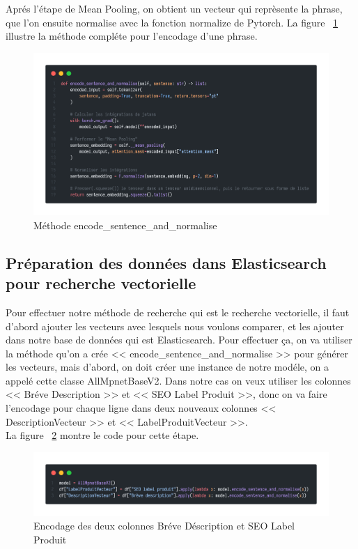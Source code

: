 \noindent
Aprés l'étape de Mean Pooling, on obtient un vecteur qui reprèsente la phrase, que l'on ensuite normalise avec la fonction normalize de Pytorch.
La figure ~\ref{fig:encodesentence} illustre la méthode compléte pour l'encodage d'une phrase.

\begin{figure}[H]
	\centering
	\includegraphics[width=\textwidth]{logos/encode_sentence.png}
	\caption{Méthode encode\_sentence\_and\_normalise}
	\label{fig:encodesentence}
\end{figure}

\subsection{Préparation des données dans Elasticsearch pour recherche vectorielle}
\noindent
Pour effectuer notre méthode de recherche qui est le recherche vectorielle, il faut d'abord ajouter les vecteurs avec lesquels nous voulons comparer, et les ajouter dans notre base de données qui est Elasticsearch. Pour effectuer ça, on va utiliser la méthode qu'on a crée << encode\_sentence\_and\_normalise >> pour générer les vecteurs, mais d'abord, on doit créer une instance de notre modéle, on a appelé cette classe AllMpnetBaseV2. Dans notre cas on veux utiliser les colonnes << Bréve Description >> et << SEO Label Produit >>, donc on va faire l'encodage pour chaque ligne dans deux nouveaux colonnes << DescriptionVecteur >> et << LabelProduitVecteur >>. \\ La figure ~\ref{fig:encoding} montre le code pour cette étape.

\begin{figure}[H]
	\centering
	\includegraphics[width=\textwidth]{logos/vectors.png}
	\caption{Encodage des deux colonnes Bréve Déscription et SEO Label Produit}
	\label{fig:encoding}
\end{figure}

